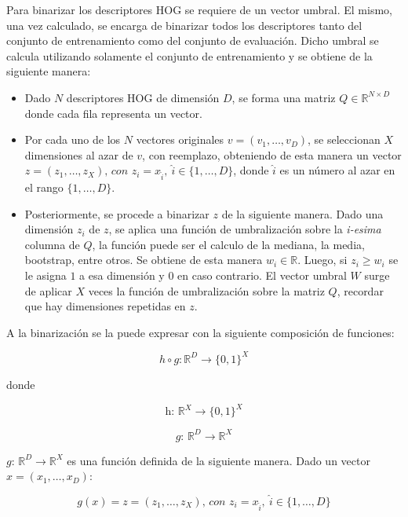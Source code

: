 	 Para binarizar los descriptores HOG se requiere de un vector umbral. El mismo, una vez  calculado, se encarga de binarizar todos los descriptores tanto del conjunto de entrenamiento como del conjunto de evaluación. Dicho umbral se calcula utilizando solamente el conjunto de entrenamiento y se obtiene de la siguiente manera:
		
		\begin{itemize}
		
			\item Dado $N$ descriptores HOG de dimensión $D$, se forma una matriz $Q \in \mathbb{R}^{N \times D}$ donde cada fila representa un vector.
			\item Por cada uno de los $N$ vectores originales $v=(v_1,\dots,v_D)$, se seleccionan $X$ dimensiones al azar de $v$, con reemplazo, obteniendo de esta manera un vector $z = (z_1,\dots,z_X) \textit{, con } z_i=x_{\hat{i}},~\hat{i} \in \{1,\dots,D\}$, donde $\hat{i}$ es un número al azar en el rango $\{1,\dots,D\}$.
			\item Posteriormente, se procede a binarizar $z$ de la siguiente manera. Dado una dimensión $z_i$ de $z$, se aplica una función de umbralización sobre la \textit{i-esima} columna de $Q$, la función puede ser el calculo de la mediana, la media, bootstrap, entre otros. Se obtiene de esta manera $w_i \in \mathbb{R}$. Luego, si $z_i \geq w_i$ se le asigna $1$ a esa dimensión y $0$ en caso contrario. El vector umbral $W$ surge de aplicar $X$ veces la función de umbralización sobre la matriz $Q$, recordar que hay dimensiones repetidas en $z$.
						
		\end{itemize}
	
	A la binarización se la puede expresar con la siguiente composición de funciones:
	
	$$h \circ g:\mathbb{R}^{D} \rightarrow \{ 0, 1\}^{X}$$
	
	donde
	
	$$\textit{h: }\mathbb{R}^{X} \rightarrow \{ 0, 1\}^{X}$$
	
	$$\textit{g: }\mathbb{R}^{D} \rightarrow \mathbb{R}^{X}$$
	
	
	$\textit{g: }\mathbb{R}^{D} \rightarrow \mathbb{R}^{X}$ es una función definida de la siguiente manera. Dado un vector  $x=(x_1, \dots, x_D)$:

	\begin{equation}
	\label{eq: g_equation}
		g(x) = z = (z_1,\dots,z_X) \textit{, con } z_i=x_{\hat{i}},~\hat{i} \in \{1,\dots,D\}
	\end{equation}		
	
